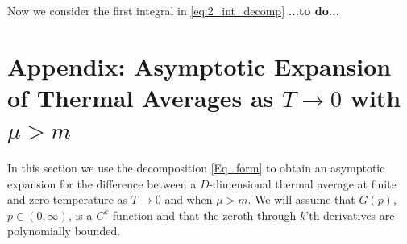 \documentclass[sn-mathphys,Numbered]{sn-jnl}
\newcommand*{\xgreen}{\color{green}}
\begin{document}
Now we consider the first integral in \eqref{eq:2_int_decomp} {\bf ...to do...}

\section{Appendix: Asymptotic Expansion of Thermal Averages as $T\to 0$ with $\mu>m$}\label{Appendix}


In this section we use the decomposition \eqref{Eq_form} to obtain an asymptotic expansion for the difference between a $D$-dimensional thermal average at finite and zero temperature as $T\to 0$ and when $\mu>m$.   We will assume that $G(p)$, $p\in(0,\infty)$, is a $C^k$ function and that the zeroth through $k$'th derivatives are polynomially bounded.
\end{document}
